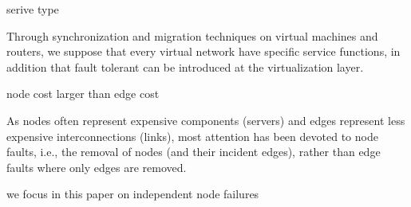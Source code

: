 serive type

Through synchronization\cite{bressoud1996hypervisor,cully2008remus} and migration techniques\cite{clark2005live,wang2008virtual} on virtual machines and routers, we suppose that every virtual network have specific service functions, in addition that fault tolerant can be introduced at the virtualization layer\cite{yeow2011designing}.

node cost larger than edge cost

As nodes often represent expensive components (servers) and edges represent less expensive interconnections (links), most attention has been devoted to node faults, i.e., the removal of nodes (and their incident edges), rather than edge faults where only edges are removed.


we focus in this paper on independent node failures

%

